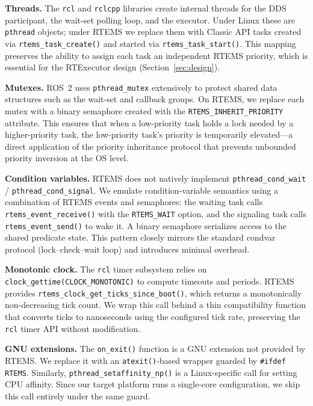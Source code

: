 \textbf{Threads.}
The \texttt{rcl} and \texttt{rclcpp} libraries create internal threads for the DDS participant, the wait-set polling loop, and the executor.
Under Linux these are \texttt{pthread} objects; under RTEMS we replace them with Classic API tasks created via \texttt{rtems\_task\_create()} and started via \texttt{rtems\_task\_start()}.
This mapping preserves the ability to assign each task an independent RTEMS priority, which is essential for the RTExecutor design (Section~\ref{sec:design}).

\textbf{Mutexes.}
ROS~2 uses \texttt{pthread\_mutex} extensively to protect shared data structures such as the wait-set and callback groups.
On RTEMS, we replace each mutex with a binary semaphore created with the \texttt{RTEMS\_INHERIT\_PRIORITY} attribute.
This ensures that when a low-priority task holds a lock needed by a higher-priority task, the low-priority task's priority is temporarily elevated---a direct application of the priority inheritance protocol that prevents unbounded priority inversion at the OS level.

\textbf{Condition variables.}
RTEMS does not natively implement \texttt{pthread\_cond\_wait} / \texttt{pthread\_cond\_signal}.
We emulate condition-variable semantics using a combination of RTEMS events and semaphores: the waiting task calls \texttt{rtems\_event\_receive()} with the \texttt{RTEMS\_WAIT} option, and the signaling task calls \texttt{rtems\_event\_send()} to wake it.
A binary semaphore serializes access to the shared predicate state.
This pattern closely mirrors the standard condvar protocol (lock--check--wait loop) and introduces minimal overhead.

\textbf{Monotonic clock.}
The \texttt{rcl} timer subsystem relies on \texttt{clock\_gettime(CLOCK\_MONOTONIC)} to compute timeouts and periods.
RTEMS provides \texttt{rtems\_clock\_get\_ticks\_since\_boot()}, which returns a monotonically non-decreasing tick count.
We wrap this call behind a thin compatibility function that converts ticks to nanoseconds using the configured tick rate, preserving the \texttt{rcl} timer API without modification.

\textbf{GNU extensions.}
The \texttt{on\_exit()} function is a GNU extension not provided by RTEMS.
We replace it with an \texttt{atexit()}-based wrapper guarded by \texttt{\#ifdef RTEMS}.
Similarly, \texttt{pthread\_setaffinity\_np()} is a Linux-specific call for setting CPU affinity.
Since our target platform runs a single-core configuration, we skip this call entirely under the same guard.

